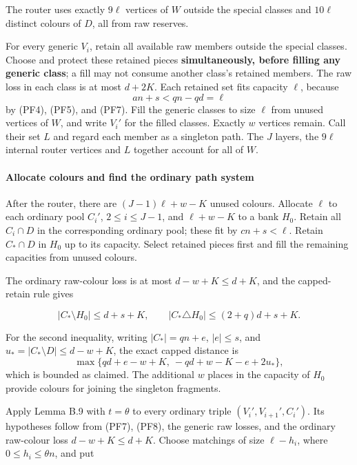 \documentclass[11pt,a4paper]{article}
\begin{document}
The router uses exactly \(9\ell\) vertices of \(W\) outside the special classes and \(10\ell\) distinct colours of \(D\), all from raw reserves.

For every generic \(V_i\), retain all available raw members outside the special classes. Choose and protect these retained pieces \textbf{simultaneously, before filling any generic class}; a fill may not consume another class's retained members. The raw loss in each class is at most \(d+2K\). Each retained set fits capacity \(\ell\), because \[
an+s<qn-qd=\ell
\] by (PF4), (PF5), and (PF7). Fill the generic classes to size \(\ell\) from unused vertices of \(W\), and write \(V_i'\) for the filled classes. Exactly \(w\) vertices remain. Call their set \(L\) and regard each member as a singleton path. The \(J\) layers, the \(9\ell\) internal router vertices and \(L\) together account for all of \(W\).

\hypertarget{allocate-colours-and-find-the-ordinary-path-system}{%
\paragraph{Allocate colours and find the ordinary path system}\label{allocate-colours-and-find-the-ordinary-path-system}}

After the router, there are \((J-1)\ell+w-K\) unused colours. Allocate \(\ell\) to each ordinary pool \(C_i'\), \(2\le i\le J-1\), and \(\ell+w-K\) to a bank \(H_0\). Retain all \(C_i\cap D\) in the corresponding ordinary pool; these fit by \(cn+s<\ell\). Retain \(C_*\cap D\) in \(H_0\) up to its capacity. Select retained pieces first and fill the remaining capacities from unused colours.

The ordinary raw-colour loss is at most \(d-w+K\le d+K\), and the capped-retain rule gives

\begin{equation}
|C_*\setminus H_0|\le d+s+K,
\qquad
|C_*\triangle H_0|\le(2+q)d+s+K.
\tag{PF10}\label{eq:PF10}
\end{equation}

For the second inequality, writing \(|C_*|=qn+e\), \(|e|\le s\), and \(u_*=|C_*\setminus D|\le d-w+K\), the exact capped distance is \[
\max\{qd+e-w+K,\ -qd+w-K-e+2u_*\},
\] which is bounded as claimed. The additional \(w\) places in the capacity of \(H_0\) provide colours for joining the singleton fragments.

Apply Lemma B.9 with \(t=\theta\) to every ordinary triple \((V_i',V_{i+1}',C_i')\). Its hypotheses follow from (PF7), (PF8), the generic raw losses, and the ordinary raw-colour loss \(d-w+K\le d+K\). Choose matchings of size \(\ell-h_i\), where \(0\le h_i\le\theta n\), and put
\end{document}
